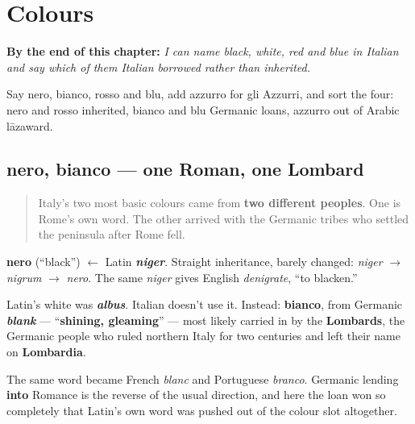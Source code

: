 
\chapter{Colours}
\label{ch:it-colours}

\begin{chapteropening}
\textbf{By the end of this chapter:} \emph{I can name black, white, red and blue in Italian and say which of them Italian borrowed rather than inherited.}

Say nero, bianco, rosso and blu, add azzurro for gli Azzurri, and sort the four: nero and rosso inherited, bianco and blu Germanic loans, azzurro out of Arabic lāzaward.
\end{chapteropening}

\section[nero, bianco]{nero, bianco — one Roman, one Lombard}

\label{lesson:IT-C13-nero-bianco}



\begin{quote}
Italy's two most basic colours came from \textbf{two different peoples}. One is Rome's own word. The other arrived with the Germanic tribes who settled the peninsula after Rome fell.
\end{quote}

\begin{cousinweb}
\textbf{nero} (\textquotedblleft{}black\textquotedblright{}) $\leftarrow$ Latin \emph{\textbf{niger}}. Straight inheritance, barely changed: \emph{niger} $\to$ \emph{nigrum} $\to$ \emph{nero}. The same \emph{niger} gives English \emph{denigrate}, \textquotedblleft{}to blacken.\textquotedblright{}
\end{cousinweb}

\begin{cousinweb}
Latin's white was \emph{\textbf{albus}}. Italian doesn't use it. Instead: \textbf{bianco}, from Germanic \emph{\textbf{blank}} — \textquotedblleft{}\textbf{shining, gleaming}\textquotedblright{} — most likely carried in by the \textbf{Lombards}, the Germanic people who ruled northern Italy for two centuries and left their name on \textbf{Lombardia}.

The same word became French \emph{blanc} and Portuguese \emph{branco}. Germanic lending \textbf{into} Romance is the reverse of the usual direction, and here the loan won so completely that Latin's own word was pushed out of the colour slot altogether.
\end{cousinweb}


